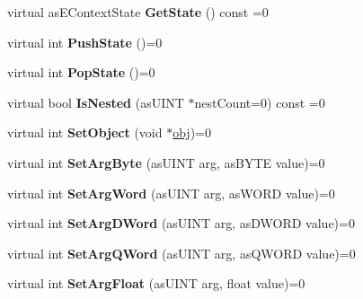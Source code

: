 \begin{DoxyCompactItemize}
\item 
\mbox{\label{classas_i_script_context_a17024a9e1648f66711a3182b21676aa7}} 
virtual as\+E\+Context\+State {\bfseries Get\+State} () const =0
\item 
\mbox{\label{classas_i_script_context_ad8f7637a23d67e227d07f65621b6cdd6}} 
virtual int {\bfseries Push\+State} ()=0
\item 
\mbox{\label{classas_i_script_context_a5d963974625e582799b5d911d182d9be}} 
virtual int {\bfseries Pop\+State} ()=0
\item 
\mbox{\label{classas_i_script_context_a378f3bbfa04ef7b806300c5d4f1a0d65}} 
virtual bool {\bfseries Is\+Nested} (as\+U\+I\+NT $\ast$nest\+Count=0) const =0
\item 
\mbox{\label{classas_i_script_context_a10d3c152b25d07584999f4d9fe5ce8b1}} 
virtual int {\bfseries Set\+Object} (void $\ast$\hyperlink{structobj}{obj})=0
\item 
\mbox{\label{classas_i_script_context_ac5ac8ce5bb209f43d4da620db5d271da}} 
virtual int {\bfseries Set\+Arg\+Byte} (as\+U\+I\+NT arg, as\+B\+Y\+TE value)=0
\item 
\mbox{\label{classas_i_script_context_ac882e19b922c681052a0a88d69289a47}} 
virtual int {\bfseries Set\+Arg\+Word} (as\+U\+I\+NT arg, as\+W\+O\+RD value)=0
\item 
\mbox{\label{classas_i_script_context_a14cac831c1b419f552ca62a239dfcf45}} 
virtual int {\bfseries Set\+Arg\+D\+Word} (as\+U\+I\+NT arg, as\+D\+W\+O\+RD value)=0
\item 
\mbox{\label{classas_i_script_context_a742c870360588e99528f09bae6156482}} 
virtual int {\bfseries Set\+Arg\+Q\+Word} (as\+U\+I\+NT arg, as\+Q\+W\+O\+RD value)=0
\item 
\mbox{\label{classas_i_script_context_a702a40cfe539e4e655a84e15161f8db8}} 
virtual int {\bfseries Set\+Arg\+Float} (as\+U\+I\+NT arg, float value)=0

\end{DoxyCompactItemize}
